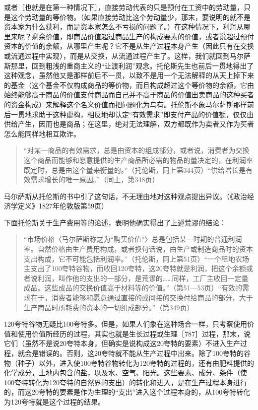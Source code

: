 或者［也就是在第一种情况下］，直接劳动代表的只是预付在工资中的劳动量，只是这个劳动量的等价物。（如果直接劳动比这个劳动量少，那末，要说明的就不是资本家为什么获利，而是资本家怎么不亏损的问题了。）在这种情况下，利润从哪里来呢？剩余价值，即商品价值超过商品生产的构成要素的价值，或者说超过预付资本的价值的余额，从哪里产生呢？它不是从生产过程本身产生（因此只有在交换或流通过程中实现），而是从交换，从流通过程产生了。这样，我们就回到马尔萨斯那里，回到粗浅的重商主义的“让渡利润”观念。托伦斯先生也前后一贯地得出了这种观念，虽然他又是那样前后不一贯，以致不是用一个无法解释的从天上掉下来的基金（这个基金不仅构成商品的等价物，而且构成超过这个等价物的余额，它由始终能够高于商品的价值支付商品而自己并不高于商品的价值出卖商品的这种买者的资金构成）来解释这个名义价值而把问题化为乌有。托伦斯不象马尔萨斯那样前后一贯地求助于这种虚构，相反地却认定“有效需求”即支付产品的价值额，仅仅由供给产生，因而也是商品；在这里，绝对无法理解，双方都既作为卖者又作为买者怎么能同样地相互欺诈。

\begin{quote}{“对某一商品的有效需求，总是由资本的组成部分，或者说，消费者为交换这个商品而能够和愿意提供的生产商品所必需的物品的量决定的，在利润率既定时，总是由这个量来衡量的。”（托伦斯，同上第344页）“供给增长是有效需求增长的唯一原因。”（同上，第348页）}\end{quote}

马尔萨斯从托伦斯的书中引了这句话，不无理由地对这种观点提出异议。（《政治经济学定义》1827年伦敦版第59页）

下面托伦斯关于生产费用等的论述，表明他确实得出了上述荒谬的结论：

\begin{quote}{“市场价格〈马尔萨斯称之为“购买价值”〉总是包括某一时期的普通利润率。自然价格由生产费用构成，或者换句话说，由生产或制造商品时的资本支出构成，它不可能包括利润率。”（托伦斯，同上第51页）“一个租地农场主支出了100夸特谷物，而收回120夸特，这20夸特就是利润，把这个余额或者说利润，叫作他的支出的一部分，是荒谬的……同样，工厂主收回一定量成品。这些成品的交换价值高于材料等的价值。”（第51—53页）“有效的需求在于，消费者能够和愿意通过直接的或间接的交换付给商品的部分，大于生产商品时所耗费的资本的一切组成部分。”（第349页）}\end{quote}

120夸特谷物无疑比100夸特多。但是，如果人们象在这种场合一样，只考察使用价值和使用价值所经历的过程，其实也就是生长过程或生理［787］过程，那末，说它们（虽然不是说20夸特本身，但确实是说构成这20夸特的要素）不进入生产过程，就会是错误的。否则，这20夸特就不能从生产过程中出来。除了100夸特的谷物（种子）以外，进入使100夸特谷物转化为120夸特的过程的，还有由肥料提供的化学成分，土地内包含的盐，以及水、空气、阳光。这些要素、成分、条件（使100夸特转化为120夸特的自然界的支出）的转化和进入，是在生产过程本身进行的，而这20夸特的要素是作为生理的“支出”进入这个过程本身的，从100夸特转化为120夸特就是这个过程的结果。

